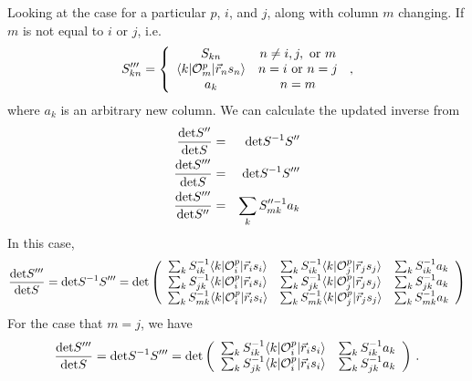 \documentclass[12pt]{article}
\begin{document}
Looking at the case for a particular $p$, $i$, and $j$, along with
column $m$ changing. If
$m$ is not equal to $i$ or $j$, i.e.
\begin{equation}
S'''_{kn} = \left \{
\begin{array}{cc}
S_{kn} & n \neq i,j,\ {\rm or}\ m\\
\langle k|{\cal O}^p_m|\vec r_n s_n\rangle & n = i\ {\rm or}\ n = j\\
a_k  & n=m\\
\end{array}
\right . \,,
\end{equation}
where $a_k$ is an arbitrary new column. We can calculate the updated inverse from
\begin{eqnarray}
\frac{{\rm det} S''}{{\rm det} S} &=& {\rm det} S^{-1} S''
\nonumber\\
\frac{{\rm det} S'''}{{\rm det} S} &=& {\rm det} S^{-1} S'''
\nonumber\\
\frac{{\rm det} S'''}{{\rm det} S''} &=& \sum_k S''^{-1}_{mk} a_k
\end{eqnarray}
In this case, 
\begin{equation}
\label{eq10}
\frac{{\rm det} S'''}{{\rm det} S} = {\rm det} S^{-1} S'''
= {\rm det} \left (
\begin{array}{ccc}
\sum_k S^{-1}_{ik}\langle k|{\cal O}_i^p|\vec r_i s_i\rangle
&\sum_k S^{-1}_{ik}\langle k|{\cal O}_j^p|\vec r_j s_j\rangle
&\sum_k S^{-1}_{ik}a_k\\
\sum_k S^{-1}_{jk}\langle k|{\cal O}_i^p|\vec r_i s_i\rangle
&\sum_k S^{-1}_{jk}\langle k|{\cal O}_j^p|\vec r_j s_j\rangle
&\sum_k S^{-1}_{jk}a_k\\
\sum_k S^{-1}_{mk}\langle k|{\cal O}_i^p|\vec r_i s_i\rangle
&\sum_k S^{-1}_{mk}\langle k|{\cal O}_j^p|\vec r_j s_j\rangle
&\sum_k S^{-1}_{mk}a_k\\
\end{array}
\right )
\end{equation}
For the case that $m=j$, we have
\begin{equation}
\frac{{\rm det} S'''}{{\rm det} S} = {\rm det} S^{-1} S'''
= {\rm det} \left (
\begin{array}{cc}
\sum_k S^{-1}_{ik}\langle k|{\cal O}_i^p|\vec r_i s_i\rangle
&\sum_kS^{-1}_{ik}a_k\\
\sum_kS^{-1}_{jk}\langle k|{\cal O}^p_i|\vec r_i s_i\rangle
&\sum_kS^{-1}_{jk}a_k\\
\end{array}
\right ) \,.
\end{equation}
\end{document}
